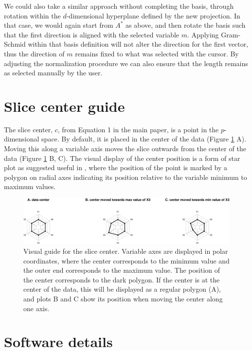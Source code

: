 \documentclass[]{interact}
\theoremstyle{plain}%
\theoremstyle{definition}
\theoremstyle{remark}
\begin{document}
We could also take a similar approach without completing the basis,
through rotation within the \(d\)-dimensional hyperplane defined by the
new projection. In that case, we would again start from \(A^*\) as
above, and then rotate the basis such that the first direction is
aligned with the selected variable \(m\). Applying Gram-Schmid within
that basis definition will not alter the direction for the first vector,
thus the direction of \(m\) remains fixed to what was selected with the
cursor. By adjusting the normalization procedure we can also ensure that
the length remains as selected manually by the user.

\hypertarget{slice-center-guide}{%
\section{Slice center guide}\label{slice-center-guide}}

The slice center, \(c\), from Equation 1 in the main paper, is a point
in the \(p\)-dimensional space. By default, it is placed in the center
of the data (Figure \ref{fig:anchornav} A). Moving this along a variable
axis moves the slice outwards from the center of the data (Figure
\ref{fig:anchornav} B, C). The visual display of the center position is
a form of star plot as suggested useful in \citet{condviz2}, where the
position of the point is marked by a polygon on radial axes indicating
its position relative to the variable minimum to maximum values.

\begin{figure}
\includegraphics[width=1\linewidth]{appendix_files/figure-latex/anchornav-1} \caption{Visual guide for the slice center. Variable axes are displayed in polar coordinates, where the center corresponds to the minimum value and the outer end corresponds to the maximum value. The position of the center corresponds to the dark polygon. If the center is at the center of the data, this will be displayed as a regular polygon (A), and plots B and C show its position when moving the center along one axis.}\label{fig:anchornav}
\end{figure}

\hypertarget{software-details}{%
\section{Software details}\label{software-details}}
\end{document}
